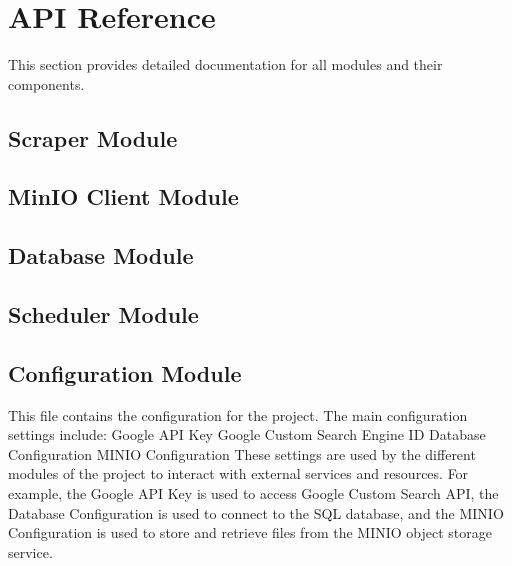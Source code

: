 \documentclass[letterpaper,10pt,english]{sphinxmanual}
\begin{document}
\sphinxstepscope


\chapter{API Reference}
\label{\detokenize{api_reference:api-reference}}\label{\detokenize{api_reference:id1}}\label{\detokenize{api_reference::doc}}
\sphinxAtStartPar
This section provides detailed documentation for all modules and their components.


\section{Scraper Module}
\label{\detokenize{api_reference:scraper-module}}

\section{MinIO Client Module}
\label{\detokenize{api_reference:minio-client-module}}

\section{Database Module}
\label{\detokenize{api_reference:database-module}}

\section{Scheduler Module}
\label{\detokenize{api_reference:scheduler-module}}

\section{Configuration Module}
\label{\detokenize{api_reference:configuration-module}}\label{\detokenize{api_reference:module-config}}
\sphinxAtStartPar
This file contains the configuration for the project.
The main configuration settings include:
\sphinxhyphen{} Google API Key
\sphinxhyphen{} Google Custom Search Engine ID
\sphinxhyphen{} Database Configuration
\sphinxhyphen{} MINIO Configuration
These settings are used by the different modules of the project to interact with external services and resources.
For example, the Google API Key is used to access Google Custom Search API, the Database Configuration is used to connect to the SQL database, and the MINIO Configuration is used to store and retrieve files from the MINIO object storage service.
\end{document}
